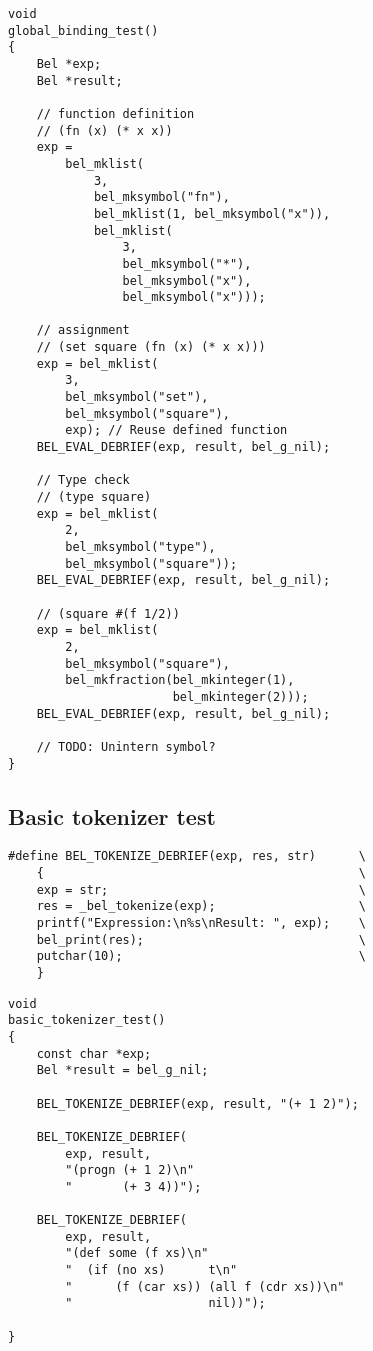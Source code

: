 \documentclass[openright,a4paper,twoside,12pt]{memoir}
\begin{document}
\begin{verbatim}
void
global_binding_test()
{
    Bel *exp;
    Bel *result;

    // function definition
    // (fn (x) (* x x))
    exp =
        bel_mklist(
            3,
            bel_mksymbol("fn"),
            bel_mklist(1, bel_mksymbol("x")),
            bel_mklist(
                3,
                bel_mksymbol("*"),
                bel_mksymbol("x"),
                bel_mksymbol("x")));
    
    // assignment
    // (set square (fn (x) (* x x)))
    exp = bel_mklist(
        3,
        bel_mksymbol("set"),
        bel_mksymbol("square"),
        exp); // Reuse defined function
    BEL_EVAL_DEBRIEF(exp, result, bel_g_nil);

    // Type check
    // (type square)
    exp = bel_mklist(
        2,
        bel_mksymbol("type"),
        bel_mksymbol("square"));
    BEL_EVAL_DEBRIEF(exp, result, bel_g_nil);
    
    // (square #(f 1/2))
    exp = bel_mklist(
        2,
        bel_mksymbol("square"),
        bel_mkfraction(bel_mkinteger(1),
                       bel_mkinteger(2)));
    BEL_EVAL_DEBRIEF(exp, result, bel_g_nil);

    // TODO: Unintern symbol?
}
\end{verbatim}

\subsection{Basic tokenizer test}
\label{sec:org0666b7f}

\begin{verbatim}
#define BEL_TOKENIZE_DEBRIEF(exp, res, str)      \
    {                                            \
    exp = str;                                   \
    res = _bel_tokenize(exp);                    \
    printf("Expression:\n%s\nResult: ", exp);    \
    bel_print(res);                              \
    putchar(10);                                 \
    }
\end{verbatim}

\begin{verbatim}
void
basic_tokenizer_test()
{
    const char *exp;
    Bel *result = bel_g_nil;

    BEL_TOKENIZE_DEBRIEF(exp, result, "(+ 1 2)");

    BEL_TOKENIZE_DEBRIEF(
        exp, result,
        "(progn (+ 1 2)\n"
        "       (+ 3 4))");

    BEL_TOKENIZE_DEBRIEF(
        exp, result,
        "(def some (f xs)\n"
        "  (if (no xs)      t\n"
        "      (f (car xs)) (all f (cdr xs))\n"
        "                   nil))");

}
\end{verbatim}
\end{document}

